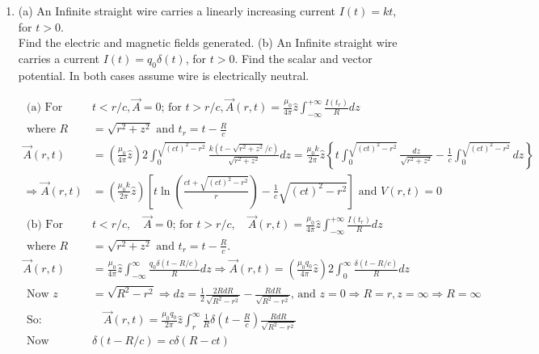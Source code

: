 \begin{enumerate}
\begin{answer}
	\end{answer}
	\item (a) An Infinite straight wire carries a linearly increasing current $I(t)=k t$, for $t>0$.\\
	Find the electric and magnetic fields generated.
	(b) An Infinite straight wire carries a current $I(t)=q_{0} \delta(t)$, for $t>0$.
	Find the scalar and vector potential. In both cases assume wire is electrically neutral.
	\begin{answer}
		\begin{align*}
		\text { (a) For }& t<r / c, \vec{A}=0 \text {; for } t>r / c, \vec{A}(r, t)=\frac{\mu_{0}}{4 \pi} \hat{z} \int_{-\infty}^{+\infty} \frac{I\left(t_{r}\right)}{R} d z\\
		\text { where } R&=\sqrt{r^{2}+z^{2}} \text { and } t_{r}=t-\frac{R}{c}\\
		\vec{A}(r, t)&=\left(\frac{\mu_{0}}{4 \pi} \hat{z}\right) 2 \int_{0}^{\sqrt{(c t)^{2}-r^{2}}} \frac{k\left(t-\sqrt{r^{2}+z^{2}} / c\right)}{\sqrt{r^{2}+z^{2}}} d z=\frac{\mu_{0} k}{2 \pi} \hat{z}\left\{t \int_{0}^{\sqrt{(c t)^{2}-r^{2}}} \frac{d z}{\sqrt{r^{2}+z^{2}}}-\frac{1}{c} \int_{0}^{\sqrt{(c t)^{2}-r^{2}}} d z\right\}\\
		\Rightarrow \vec{A}(r, t)&=\left(\frac{\mu_{0} k}{2 \pi} \hat{z}\right)\left[t \ln \left(\frac{c t+\sqrt{(c t)^{2}-r^{2}}}{r}\right)-\frac{1}{c} \sqrt{(c t)^{2}-r^{2}}\right] \text { and } V(r, t)=0\\
		\text { (b) For } &t<r / c, \quad \vec{A}=0 \text {; for } t>r / c, \quad \vec{A}(r, t)=\frac{\mu_{0}}{4 \pi} \hat{z} \int_{-\infty}^{+\infty} \frac{I\left(t_{r}\right)}{R} d z\\
		\text { where } R&=\sqrt{r^{2}+z^{2}} \text { and } t_{r}=t-\frac{R}{c} \text {. }\\
		\vec{A}(r, t)&=\frac{\mu_{0}}{4 \pi} \hat{z} \int_{-\infty}^{\infty} \frac{q_{0} \delta(t-R / c)}{R} d z \Rightarrow \vec{A}(r, t)=\left(\frac{\mu_{0} q_{0}}{4 \pi} \hat{z}\right) 2 \int_{0}^{\infty} \frac{\delta(t-R / c)}{R} d z\\
		\text { Now } z&=\sqrt{R^{2}-r^{2}} \Rightarrow d z=\frac{1}{2} \frac{2 R d R}{\sqrt{R^{2}-r^{2}}}-\frac{R d R}{\sqrt{R^{2}-r^{2}}} \text {, and } z=0 \Rightarrow R=r, z=\infty \Rightarrow R=\infty\\
		\text { So: } &\quad \vec{A}(r, t)=\frac{\mu_{0} q_{0}}{2 \pi} \hat{z} \int_{r}^{\infty} \frac{1}{R} \delta\left(t-\frac{R}{c}\right) \frac{R d R}{\sqrt{R^{2}-r^{2}}}\\
		\text { Now }& \delta(t-R / c)=c \delta(R-c t)\\

\end{align*}
\end{answer}
\end{enumerate}
